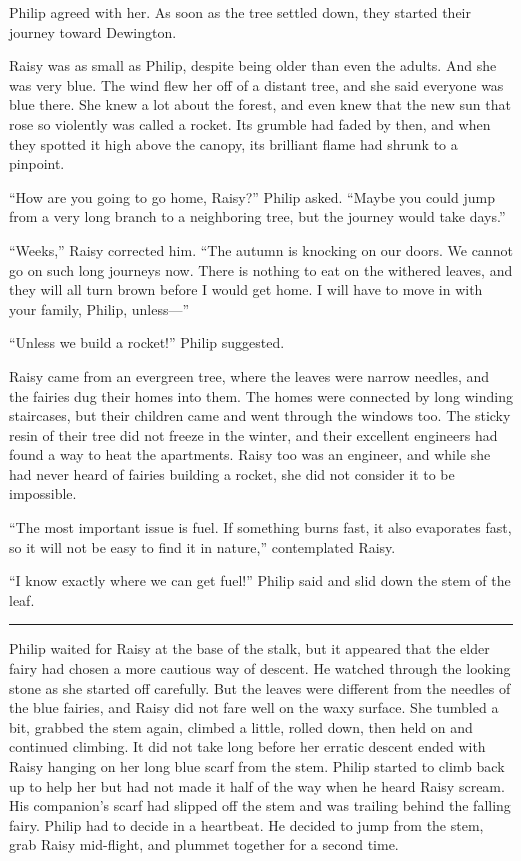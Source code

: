 \documentclass[10pt]{memoir}
\renewcommand{\pfbreakdisplay}{\bigskip \ding{166} \bigskip}
\newcommand{\secbreak}{\fancybreak{\pfbreakdisplay}}
\begin{document}
Philip agreed with her. As soon as the tree settled down, they started their
journey toward Dewington.

Raisy was as small as Philip, despite being older than even the adults. And she
was very blue. The wind flew her off of a distant tree, and she said everyone
was blue there. She knew a lot about the forest, and even knew that the new sun
that rose so violently was called a rocket. Its grumble had faded by then, and
when they spotted it high above the canopy, its brilliant flame had shrunk to a
pinpoint.

``How are you going to go home, Raisy?'' Philip asked. ``Maybe you could jump
from a very long branch to a neighboring tree, but the journey would take
days.''

``Weeks,'' Raisy corrected him. ``The autumn is knocking on our doors. We
cannot go on such long journeys now. There is nothing to eat on the withered
leaves, and they will all turn brown before I would get home. I will have to
move in with your family, Philip, unless---''

``Unless we build a rocket!'' Philip suggested.

Raisy came from an evergreen tree, where the leaves were narrow needles, and
the fairies dug their homes into them. The homes were connected by long winding
staircases, but their children came and went through the windows too. The
sticky resin of their tree did not freeze in the winter, and their excellent
engineers had found a way to heat the apartments. Raisy too was an engineer,
and while she had never heard of fairies building a rocket, she did not
consider it to be impossible.

``The most important issue is fuel. If something burns fast, it also evaporates
fast, so it will not be easy to find it in nature,'' contemplated Raisy.

``I know exactly where we can get fuel!'' Philip said and slid down the stem of
the leaf.

\secbreak

Philip waited for Raisy at the base of the stalk, but it appeared that the
elder fairy had chosen a more cautious way of descent. He watched through the
looking stone as she started off carefully. But the leaves were different from
the needles of the blue fairies, and Raisy did not fare well on the waxy
surface. She tumbled a bit, grabbed the stem again, climbed a little, rolled
down, then held on and continued climbing. It did not take long before her
erratic descent ended with Raisy hanging on her long blue scarf from the stem.
Philip started to climb back up to help her but had not made it half of the way
when he heard Raisy scream. His companion's scarf had slipped off the stem and
was trailing behind the falling fairy. Philip had to decide in a heartbeat. He
decided to jump from the stem, grab Raisy mid-flight, and plummet together for
a second time.
\end{document}
